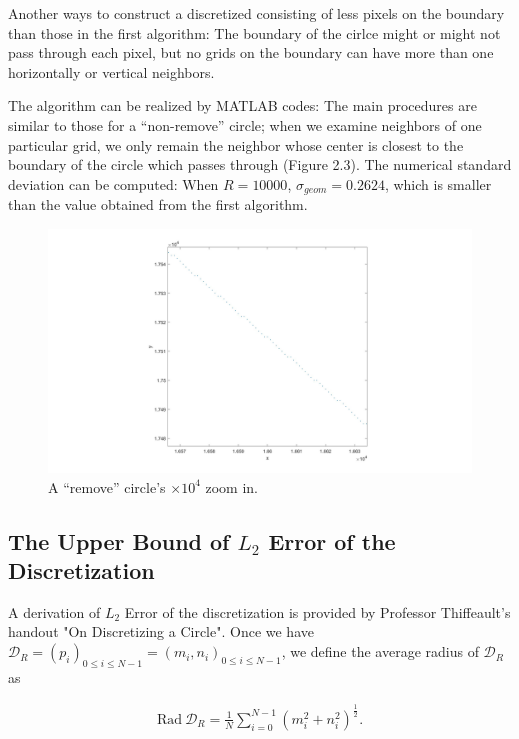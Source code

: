 \documentclass[letterpaper]{article}
\numberwithin{equation}{section} %
\numberwithin{figure}{section} %
\numberwithin{table}{section} %
\begin{document}
Another ways to construct a discretized consisting of less pixels on the boundary than those in the first algorithm: The boundary of the cirlce might or might not pass through each pixel, but no grids on the boundary can have more than one horizontally or vertical neighbors.

The algorithm can be realized by MATLAB codes: The main procedures are similar to those for a \enquote{non-remove} circle; when we examine neighbors of one particular grid, we only remain the neighbor whose center is closest to the boundary of the circle which passes through (Figure 2.3). The numerical standard deviation can be computed: When $R=10000$, $\sigma_{geom}=0.2624$, which is smaller than the value obtained from the first algorithm.


\begin{figure}[h]
	\centering
	\includegraphics[width=\textwidth]{rmvCircleZI}
	\caption{A \enquote{remove} circle's $\times 10^4$ zoom in.}
	\label{rmvCircleZI}
\end{figure}

\subsection{The Upper Bound of $L_{2}$ Error of the Discretization}

A derivation of $L_{2}$ Error of the discretization is provided by Professor Thiffeault's handout "On Discretizing a Circle". Once we have $\mathcal{D}_R=(p_{i})_{0 \leq i \leq N-1} = (m_i, n_i)_{0 \leq i \leq N-1}$, we define the average radius of $\mathcal{D}_R$ as


\begin{align} 
\text{Rad} \ \mathcal{D}_R=\frac{1}{N} \sum_{i=0}^{N-1} (m_i^2+n_i^2)^{\frac{1}{2}}.
\end{align}
\end{document}
